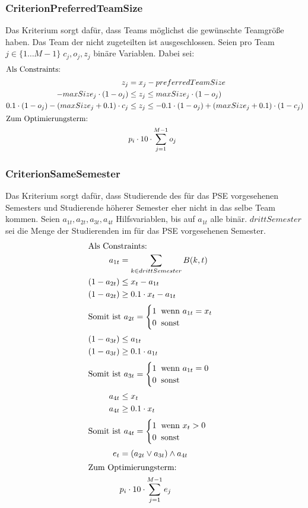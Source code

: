 \documentclass[parskip=full]{scrartcl}
\begin{document}
\subsubsection{CriterionPreferredTeamSize}
Das Kriterium sorgt dafür, dass Teams möglichst die gewünschte Teamgröße haben.
Das Team der nicht zugeteilten ist ausgeschlossen. Seien pro Team $j \in \{1\ldots M-1 \} \; c_j,o_j,z_j$ binäre Variablen.
Dabei sei: 
\begin{align*}
\intertext{Als Constraints: }
z_j &=x_j - preferredTeamSize\\
-maxSize_j \cdot (1-o_j) &\le z_j \le maxSize_j \cdot (1-o_j)\\
0.1\cdot(1-o_j) - (maxSize_j + 0.1)\cdot c_j &\le z_j \le -0.1\cdot
(1-o_j)+(maxSize_j +0.1)\cdot(1-c_j)\\
\intertext{Zum Optimierungsterm:} 
 &p_i \cdot 10 \cdot \sum_{j = 1}^{M-1}
o_j
\end{align*}
\subsubsection{CriterionSameSemester}
Das Kriterium sorgt dafür, dass Studierende des für das PSE vorgesehenen
Semesters und Studierende höherer Semester eher nicht in das selbe Team kommen. 
Seien $a_{1t},a_{2t},a_{3t},a_{4t}$ Hilfsvariablen, bis auf $a_{1t}$ alle binär.
$drittSemester$ sei die Menge der Studierenden im für das PSE vorgesehenen
Semester.
\begin{align*}
\intertext{Als Constraints:} 
a_{1t} &= \sum_{k \in drittSemester} B(k,t) \\
(1 - a_{2t}) &\le x_t - a_{1t} \\ (1 - a_{2t}) &\ge 0.1 \cdot x_t - a_{1t} \\
\intertext{$\text{Somit ist } a_{2t} = \begin{cases}
    1 \;\; \text{wenn $a_{1t} = x_t$} \\
    0 \;\; \text{sonst} 
\end{cases}$}
(1-a_{3t}) &\le a_{1t} \\
(1-a_{3t}) &\ge 0.1 \cdot a_{1t}\\
\intertext{$\text{Somit ist } a_{3t} = \begin{cases}
    1 \;\; \text{wenn $a_{1t} = 0$} \\
    0 \;\; \text{sonst} 
\end{cases}$}
a_{4t} &\le x_t \\
a_{4t} &\ge 0.1 \cdot x_t \\
\intertext{$\text{Somit ist } a_{4t} = \begin{cases}
    1 \;\; \text{wenn $x_t > 0$} \\
    0 \;\; \text{sonst} 
\end{cases}$}
e_t &= (a_{2t} \vee a_{3t}) \wedge a_{4t}\\ \intertext{Zum Optimierungsterm:} 
&p_i \cdot 10 \cdot \sum_{j=1 }^{M-1} e_j
\end{align*}
\end{document}

